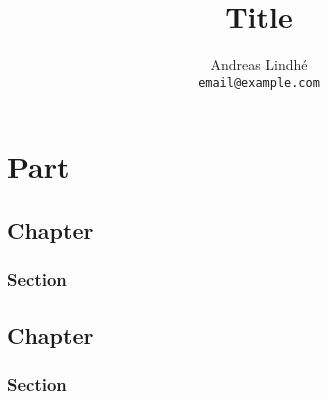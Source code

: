 \documentclass[a4paper]{report}
\title{Title}
\author{Andreas Lindhé\\
    \texttt{email@example.com}}
\begin{document}
\maketitle

\tableofcontents

\abstract

\lipsum[1]

\part{Part}

\chapter{Chapter}

\section{Section} %

%

\lipsum[1-2]


\appendix 

\chapter{Chapter}

\section{Section}

%

\lipsum[1-2]
\end{document}
